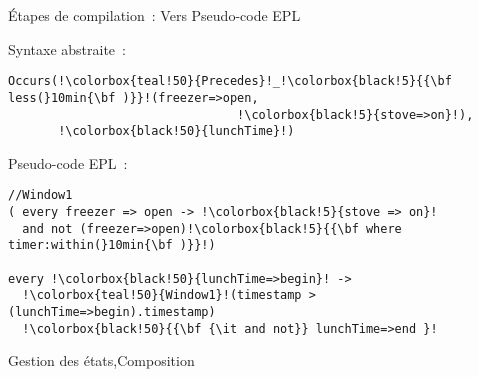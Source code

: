 \begin{frame}[fragile]{Étapes de compilation~: Vers Pseudo-code EPL}
\addtocounter{framenumber}{-1}
\vspace*{3.4mm}
  \begin{minipage}{.45\linewidth}
      \begin{coloredbox}[black]{\tiny Syntaxe abstraite~:}
      \begin{lstlisting}[language=Maloya,basicstyle=\ttfamily\tiny,escapechar=!]
Occurs(!\colorbox{teal!50}{Precedes}!_!\colorbox{black!5}{{\bf less(}10min{\bf )}}!(freezer=>open,
                                !\colorbox{black!5}{stove=>on}!),
       !\colorbox{black!50}{lunchTime}!)
      \end{lstlisting}
\end{coloredbox}
    \vfill
            \begin{coloredbox}[black]{\tiny Pseudo-code EPL~:}
      \begin{lstlisting}[language=EPLPseudoCode,basicstyle=\ttfamily\tiny,escapechar=!]
//Window1
( every freezer => open -> !\colorbox{black!5}{stove => on}! 
  and not (freezer=>open)!\colorbox{black!5}{{\bf where timer:within(}10min{\bf )}}!) 

every !\colorbox{black!50}{lunchTime=>begin}! ->
  !\colorbox{teal!50}{Window1}!(timestamp > (lunchTime=>begin).timestamp)
  !\colorbox{black!50}{{\bf {\it and not}} lunchTime=>end }!
      \end{lstlisting}
\end{coloredbox}
  \end{minipage}
  \hfill
  \begin{minipage}{.52\linewidth}
    \vspace*{-68.7mm}
    \begin{tiny}
      \colorbox{black!50}{Gestion des états},\colorbox{teal!50}{Composition}
    \end{tiny}
  \end{minipage}
\end{frame}

